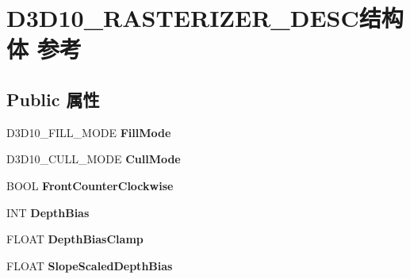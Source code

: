 \hypertarget{struct_d3_d10___r_a_s_t_e_r_i_z_e_r___d_e_s_c}{}\section{D3\+D10\+\_\+\+R\+A\+S\+T\+E\+R\+I\+Z\+E\+R\+\_\+\+D\+E\+S\+C结构体 参考}
\label{struct_d3_d10___r_a_s_t_e_r_i_z_e_r___d_e_s_c}
\subsection*{Public 属性}
\begin{DoxyCompactItemize}
\item 
\mbox{\label{struct_d3_d10___r_a_s_t_e_r_i_z_e_r___d_e_s_c_a80fdff741c2296629d9810a53cef0563}} 
D3\+D10\+\_\+\+F\+I\+L\+L\+\_\+\+M\+O\+DE {\bfseries Fill\+Mode}
\item 
\mbox{\label{struct_d3_d10___r_a_s_t_e_r_i_z_e_r___d_e_s_c_a4308e53cae23a9618020f2c0f9d6f19c}} 
D3\+D10\+\_\+\+C\+U\+L\+L\+\_\+\+M\+O\+DE {\bfseries Cull\+Mode}
\item 
\mbox{\label{struct_d3_d10___r_a_s_t_e_r_i_z_e_r___d_e_s_c_a9127494dd0f109b045a5a0fe7a8cb7c8}} 
B\+O\+OL {\bfseries Front\+Counter\+Clockwise}
\item 
\mbox{\label{struct_d3_d10___r_a_s_t_e_r_i_z_e_r___d_e_s_c_aa6470b75b2360c01d4278adda1460ec1}} 
I\+NT {\bfseries Depth\+Bias}
\item 
\mbox{\label{struct_d3_d10___r_a_s_t_e_r_i_z_e_r___d_e_s_c_a4c180a593dba0ade0513cc55958b3790}} 
F\+L\+O\+AT {\bfseries Depth\+Bias\+Clamp}
\item 
\mbox{\label{struct_d3_d10___r_a_s_t_e_r_i_z_e_r___d_e_s_c_a5408014a5a9fcbcc55705566a1efe3df}} 
F\+L\+O\+AT {\bfseries Slope\+Scaled\+Depth\+Bias}
\item 
\mbox{\label{struct_d3_d10___r_a_s_t_e_r_i_z_e_r___d_e_s_c_acca6c8d143e78803e50265a5f3129f92}} 

\end{DoxyCompactItemize}
